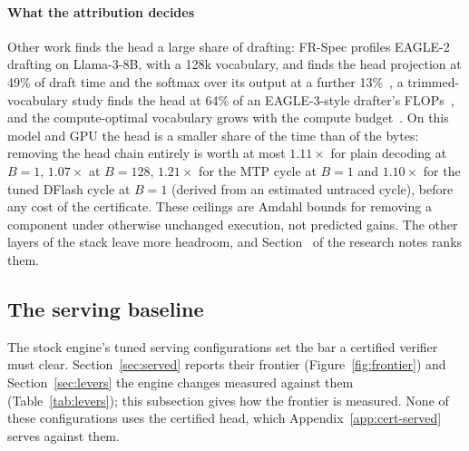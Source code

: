 \paragraph{What the attribution decides} Other work finds the head a large share of drafting: FR-Spec profiles EAGLE-2 drafting on Llama-3-8B, with a 128k vocabulary, and finds the head projection at 49\% of draft time and the softmax over its output at a further 13\%~\cite{frspec}, a trimmed-vocabulary study finds the head at 64\% of an EAGLE-3-style drafter's FLOPs~\cite{benshoham2026}, and the compute-optimal vocabulary grows with the compute budget~\cite{tao2024vocab}. On this model and GPU the head is a smaller share of the time than of the bytes: removing the head chain entirely is worth at most $1.11\times$ for plain decoding at $B=1$, $1.07\times$ at $B=128$, $1.21\times$ for the MTP cycle at $B=1$ and $1.10\times$ for the tuned DFlash cycle at $B=1$ (derived from an estimated untraced cycle), before any cost of the certificate. These ceilings are Amdahl bounds for removing a component under otherwise unchanged execution, not predicted gains. The other layers of the stack leave more headroom, and Section~ of the research notes ranks them.

\subsection{The serving baseline}\label{app:serving}\label{sec:serving}
The stock engine's tuned serving configurations set the bar a certified verifier must clear. Section~\ref{sec:served} reports their frontier (Figure~\ref{fig:frontier}) and Section~\ref{sec:levers} the engine changes measured against them (Table~\ref{tab:levers}); this subsection gives how the frontier is measured. None of these configurations uses the certified head, which Appendix~\ref{app:cert-served} serves against them.

